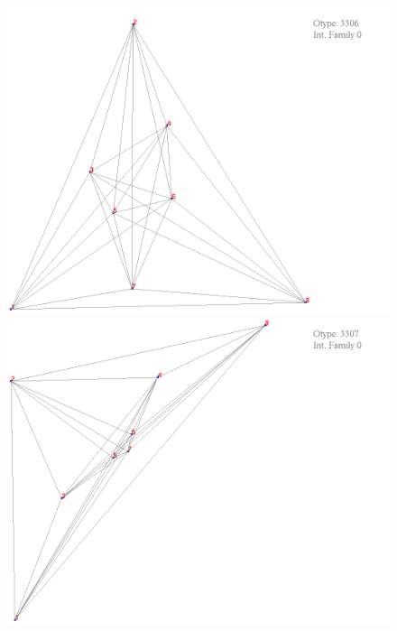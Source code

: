 \documentclass[11pt,epsf,times,letterpaper]{article}
\begin{document}
	\begin{figure}
		\includegraphics[scale=.4]{if_tam0_tam1/17.png}
		\includegraphics[scale=.4]{if_tam0_tam1/18.png}
	\end{figure}
	
\end{document}
